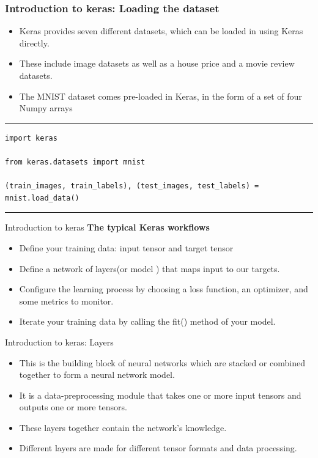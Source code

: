 \documentclass[11pt]{beamer}
\begin{document}
\begin{frame}[fragile]
\frametitle{Introduction to keras: Loading the dataset}
\begin{itemize}
\item Keras provides seven different datasets, which can be loaded in using Keras directly. 
\item These include image datasets as well as a house price and a movie review datasets.
\item The MNIST dataset comes pre-loaded in Keras, in the form of a set of four Numpy arrays
\end{itemize}
\rule{\textwidth}{1pt}
\scriptsize
\begin{verbatim}
import keras

from keras.datasets import mnist

(train_images, train_labels), (test_images, test_labels) = mnist.load_data()

\end{verbatim}
\rule{\textwidth}{1pt}
\end{frame}
%
%
\begin{frame}{Introduction to keras}
\textbf{The typical Keras workflows}
\vspace{0.5cm}
	\begin{itemize}
		\item Define your training data: input tensor and target tensor
		\item Define a network of layers(or model ) that maps input to our targets.
		\item Configure the learning process by choosing a loss function, an optimizer, and some metrics to monitor.
		\item Iterate your training data by calling the fit() method of your model.
	\end{itemize}
\end{frame}
%
%
\begin{frame}{Introduction to keras: Layers}
	\begin{itemize}
		\item This is the building block of neural networks which are stacked or combined together to form a neural network model.
		\item It is a data-preprocessing module that takes one or more input tensors and outputs one or more tensors. 
		\item These layers together contain the network's knowledge. 
		\item Different layers are made for different tensor formats and data processing.
	\end{itemize}
\end{frame}
\end{document}
